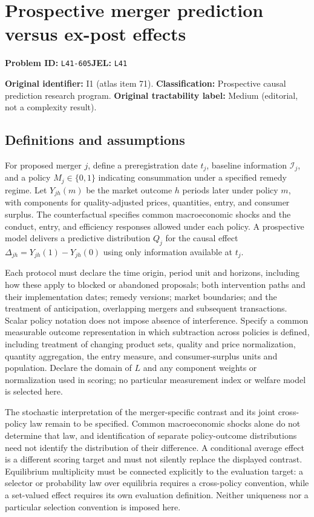 \documentclass[11pt,a4paper]{article}
\begin{document}
\section*{Prospective merger prediction versus ex-post effects}
\textbf{Problem ID:} \texttt{L41-605}\quad \textbf{JEL:} \texttt{L41}\par
\label{problem:OP-0071}
\label{atlas:prob:I1}

\noindent\textbf{Original identifier:} I1 (atlas item 71). \textbf{Classification:} Prospective causal prediction research program. \textbf{Original tractability label:} Medium (editorial, not a complexity result).

\subsection*{Definitions and assumptions}

For proposed merger $j$, define a preregistration date $t_j$, baseline information $\mathcal I_j$, and a policy $M_j\in\{0,1\}$ indicating consummation under a specified remedy regime. Let $Y_{jh}(m)$ be the market outcome $h$ periods later under policy $m$, with components for quality-adjusted prices, quantities, entry, and consumer surplus. The counterfactual specifies common macroeconomic shocks and the conduct, entry, and efficiency responses allowed under each policy. A prospective model delivers a predictive distribution $Q_j$ for the causal effect $\Delta_{jh}=Y_{jh}(1)-Y_{jh}(0)$ using only information available at $t_j$.

Each protocol must declare the time origin, period unit and horizons, including how these apply to blocked or abandoned proposals; both intervention paths and their implementation dates; remedy versions; market boundaries; and the treatment of anticipation, overlapping mergers and subsequent transactions. Scalar policy notation does not impose absence of interference. Specify a common measurable outcome representation in which subtraction across policies is defined, including treatment of changing product sets, quality and price normalization, quantity aggregation, the entry measure, and consumer-surplus units and population. Declare the domain of $L$ and any component weights or normalization used in scoring; no particular measurement index or welfare model is selected here.

The stochastic interpretation of the merger-specific contrast and its joint cross-policy law remain to be specified. Common macroeconomic shocks alone do not determine that law, and identification of separate policy-outcome distributions need not identify the distribution of their difference. A conditional average effect is a different scoring target and must not silently replace the displayed contrast. Equilibrium multiplicity must be connected explicitly to the evaluation target: a selector or probability law over equilibria requires a cross-policy convention, while a set-valued effect requires its own evaluation definition. Neither uniqueness nor a particular selection convention is imposed here.
\end{document}
